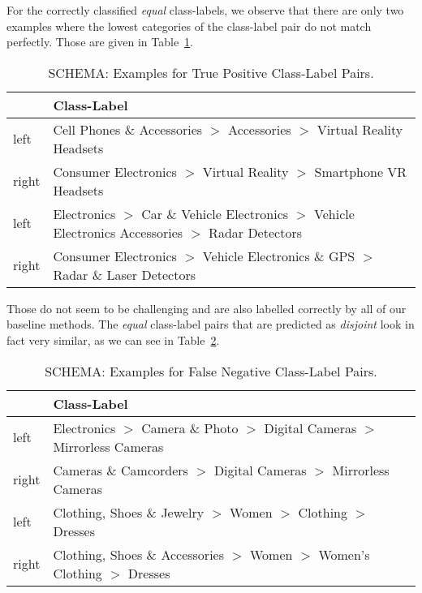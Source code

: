For the correctly classified \emph{equal} class-labels, we observe that there are only two examples where the lowest categories
of the class-label pair do not match perfectly.
Those are given in Table~\ref{tab:schema-correct}.
\begin{table}[htbp]
    \begin{center}
        \begin{tabularx}{\textwidth}{lX}
            & Class-Label \\
            \hline
            left & Cell Phones \& Accessories $>$ Accessories $>$ Virtual Reality Headsets \\
            right & Consumer Electronics $>$ Virtual Reality $>$ Smartphone VR Headsets \\
            \hline
            left & Electronics $>$ Car \& Vehicle Electronics $>$ Vehicle Electronics Accessories $>$ Radar Detectors \\
            right & Consumer Electronics $>$ Vehicle Electronics \& GPS $>$ Radar \& Laser Detectors \\
        \end{tabularx}
        \caption{SCHEMA: Examples for True Positive Class-Label Pairs.}
        \label{tab:schema-correct}
    \end{center}
\end{table}

Those do not seem to be challenging and are also labelled correctly by all of our baseline methods.
The \emph{equal} class-label pairs that are predicted as \emph{disjoint} look in fact very similar, as we can see in Table~\ref{tab:schema-error}.
\begin{table}[htbp]
    \begin{center}
        \begin{tabularx}{\textwidth}{lX}
            & Class-Label \\
            \hline
            left & Electronics $>$ Camera \& Photo $>$ Digital Cameras $>$ Mirrorless Cameras \\
            right & Cameras \& Camcorders $>$ Digital Cameras $>$ Mirrorless Cameras \\
            \hline
            left & Clothing, Shoes \& Jewelry $>$ Women $>$ Clothing $>$ Dresses \\
            right & Clothing, Shoes \& Accessories $>$ Women $>$ Women's Clothing $>$ Dresses \\
        \end{tabularx}
        \caption{SCHEMA: Examples for False Negative Class-Label Pairs.}
        \label{tab:schema-error}
    \end{center}
\end{table}


